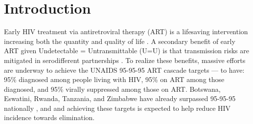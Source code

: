 \section{Introduction}\label{art.intro}
Early HIV treatment via antiretroviral therapy (ART)
is a lifesaving intervention increasing both the quantity and quality of life
\cite{Gabillard2013,Maartens2014,Danel2015,Lundgren2015init}.
A secondary benefit of early ART given Undetectable = Untransmittable (U=U) is that
transmission risks are mitigated in serodifferent partnerships
\cite{Anglemyer2013,Cohen2016,Rodger2019}.
To realize these benefits, massive efforts are underway to achieve
the UNAIDS 95-95-95 ART cascade targets \cite{959595} --- \ie to have:
95\% diagnosed among people living with HIV,
95\% on ART among those diagnosed, and
95\% virally suppressed among those on ART.
Botswana, Eswatini, Rwanda, Tanzania, and Zimbabwe
have already surpassed 95-95-95 nationally \cite{UNAIDS2023path}, and
and achieving these targets is expected to help reduce HIV incidence towards elimination.

